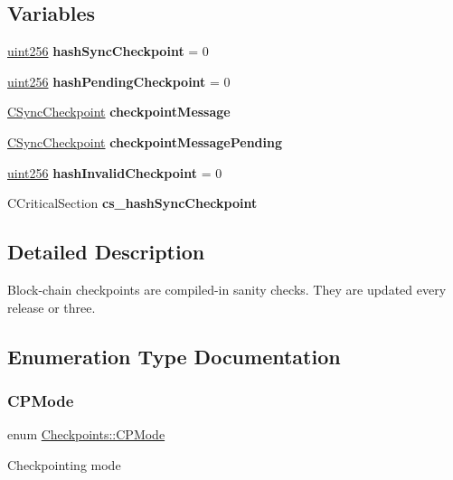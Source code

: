 \subsection*{Variables}
\begin{DoxyCompactItemize}
\item 
\mbox{\label{namespace_checkpoints_ae6bf7381439fe6995194c0b636bd6f37}} 
\mbox{\hyperlink{classuint256}{uint256}} {\bfseries hash\+Sync\+Checkpoint} = 0
\item 
\mbox{\label{namespace_checkpoints_ab5d6617d4fdb6d1551fc26de92ff89c5}} 
\mbox{\hyperlink{classuint256}{uint256}} {\bfseries hash\+Pending\+Checkpoint} = 0
\item 
\mbox{\label{namespace_checkpoints_a869cfb2e43e85cb96944fc1755535c09}} 
\mbox{\hyperlink{class_c_sync_checkpoint}{C\+Sync\+Checkpoint}} {\bfseries checkpoint\+Message}
\item 
\mbox{\label{namespace_checkpoints_a04efccf8c2c8334f72a8052e9c9463ec}} 
\mbox{\hyperlink{class_c_sync_checkpoint}{C\+Sync\+Checkpoint}} {\bfseries checkpoint\+Message\+Pending}
\item 
\mbox{\label{namespace_checkpoints_ad11a12f62aaac4d6a870d266f76cec8e}} 
\mbox{\hyperlink{classuint256}{uint256}} {\bfseries hash\+Invalid\+Checkpoint} = 0
\item 
\mbox{\label{namespace_checkpoints_a14bcb9bf139c346d98bdf1db1c8f3e95}} 
C\+Critical\+Section {\bfseries cs\+\_\+hash\+Sync\+Checkpoint}
\end{DoxyCompactItemize}


\subsection{Detailed Description}
Block-\/chain checkpoints are compiled-\/in sanity checks. They are updated every release or three. 

\subsection{Enumeration Type Documentation}
\mbox{\label{namespace_checkpoints_ab7f99b2c7e9fc7152af4f4bf36816c83}} 
\subsubsection{\texorpdfstring{CPMode}{CPMode}}
{\footnotesize\ttfamily enum \mbox{\hyperlink{namespace_checkpoints_ab7f99b2c7e9fc7152af4f4bf36816c83}{Checkpoints\+::\+C\+P\+Mode}}}

Checkpointing mode 